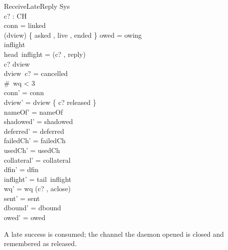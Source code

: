 \documentclass[a4paper,10pt,fleqn]{article}
\begin{document}
\begin{schema}{ReceiveLateReply}
  \Delta Sys \\
  c? : CH \\
\where
  conn = linked \\
  (\ran dview) \cap \{ asked , live , ended \} \neq \emptyset \lor owed = owing \\
  inflight \neq \langle \rangle \\
  head~inflight = (c? , reply) \\
  c? \in \dom dview \\
  dview~c? = cancelled \\
  \#~wq < 3 \\
  conn' = conn \\
  dview' = dview \oplus \{ c? \mapsto released \} \\
  nameOf' = nameOf \\
  shadowed' = shadowed \\
  deferred' = deferred \\
  failedCh' = failedCh \\
  usedCh' = usedCh \\
  collateral' = collateral \\
  dfin' = dfin \\
  inflight' = tail~inflight \\
  wq' = wq \cat \langle (c? , aclose) \rangle \\
  sent' = sent \\
  dbound' = dbound \\
  owed' = owed
\end{schema}

A late success is consumed; the channel the daemon opened is closed and remembered as released.
\end{document}
